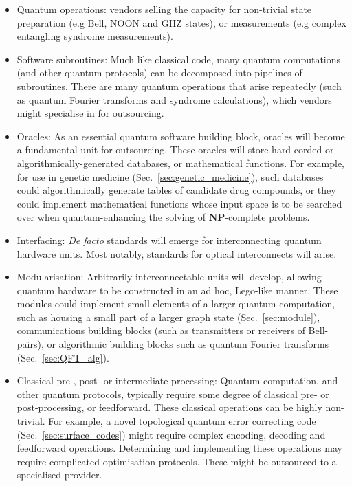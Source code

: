 \begin{itemize}
\item Quantum operations: vendors selling the capacity for non-trivial state preparation (e.g Bell, NOON and GHZ states), or measurements (e.g complex entangling syndrome measurements).

\item Software subroutines: Much like classical code, many quantum computations (and other quantum protocols) can be decomposed into pipelines of subroutines. There are many quantum operations that arise repeatedly (such as quantum Fourier transforms and syndrome calculations), which vendors might specialise in for outsourcing.

\item Oracles: As an essential quantum software building block, oracles will become a fundamental unit for outsourcing. These oracles will store hard-corded or algorithmically-generated databases, or mathematical functions. For example, for use in genetic medicine (Sec.~\ref{sec:genetic_medicine}), such databases could algorithmically generate tables of candidate drug compounds, or they could implement mathematical functions whose input space is to be searched over when quantum-enhancing the solving of \textbf{NP}-complete problems.

\item Interfacing: \textit{De facto} standards will emerge for interconnecting quantum hardware units. Most notably, standards for optical interconnects will arise.

\item Modularisation: Arbitrarily-interconnectable units will develop, allowing quantum hardware to be constructed in an ad hoc, Lego-like manner. These modules could implement small elements of a larger quantum computation, such as housing a small part of a larger graph state (Sec.~\ref{sec:module}), communications building blocks (such as transmitters or receivers of Bell-pairs), or algorithmic building blocks such as quantum Fourier transforms (Sec.~\ref{sec:QFT_alg}).

\item Classical pre-, post- or intermediate-processing: Quantum computation, and other quantum protocols, typically require some degree of classical pre- or post-processing, or feedforward. These classical operations can be highly non-trivial. For example, a novel topological quantum error correcting code (Sec.~\ref{sec:surface_codes}) might require complex encoding, decoding and feedforward operations. Determining and implementing these operations may require complicated optimisation protocols. These might be outsourced to a specialised provider.


\end{itemize}
